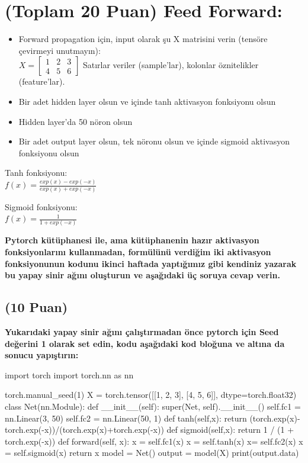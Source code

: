 \documentclass[11pt]{article}
\begin{document}
\section{(Toplam 20 Puan) Feed Forward:}
 
\begin{itemize}
    \item Forward propagation için, input olarak şu X matrisini verin (tensöre çevirmeyi unutmayın):\\
    $X = \begin{bmatrix}
        1 & 2 & 3\\
        4 & 5 & 6
        \end{bmatrix}$
    Satırlar veriler (sample'lar), kolonlar öznitelikler (feature'lar).
    \item Bir adet hidden layer olsun ve içinde tanh aktivasyon fonksiyonu olsun
    \item Hidden layer'da 50 nöron olsun
    \item Bir adet output layer olsun, tek nöronu olsun ve içinde sigmoid aktivasyon fonksiyonu olsun
\end{itemize}

Tanh fonksiyonu:\\
$f(x) = \frac{exp(x) - exp(-x)}{exp(x) + exp(-x)}$
\vspace{.2in}

Sigmoid fonksiyonu:\\
$f(x) = \frac{1}{1 + exp(-x)}$

\vspace{.2in}
 \textbf{Pytorch kütüphanesi ile, ama kütüphanenin hazır aktivasyon fonksiyonlarını kullanmadan, formülünü verdiğim iki aktivasyon fonksiyonunun kodunu ikinci haftada yaptığımız gibi kendiniz yazarak bu yapay sinir ağını oluşturun ve aşağıdaki üç soruya cevap verin.}
 \newpage
\subsection{(10 Puan)} \textbf{Yukarıdaki yapay sinir ağını çalıştırmadan önce pytorch için Seed değerini 1 olarak set edin, kodu aşağıdaki kod bloğuna ve altına da sonucu yapıştırın:}

\begin{python}
import torch
import torch.nn as nn

torch.manual_seed(1)
X = torch.tensor([[1, 2, 3], [4, 5, 6]], dtype=torch.float32)
class Net(nn.Module):
    def __init__(self):
        super(Net, self).__init__()
        self.fc1 = nn.Linear(3, 50)
        self.fc2 = nn.Linear(50, 1)
    def tanh(self,x):
      return (torch.exp(x)-torch.exp(-x))/(torch.exp(x)+torch.exp(-x))
    def sigmoid(self,x):
      return 1 / (1 + torch.exp(-x))
    def forward(self, x):
        x = self.fc1(x)
        x = self.tanh(x)
        x= self.fc2(x)
        x = self.sigmoid(x)
        return x
model = Net()
output = model(X)
print(output.data)
\end{python}
\end{document}
